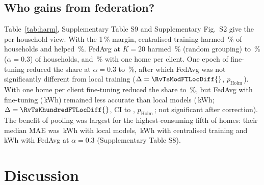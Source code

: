 \subsection{Who gains from federation?}
Table~\ref{tab:harm}, Supplementary Table S9 and Supplementary Fig.~S2 give the per-household view. With the 1\,\% margin, centralised training
harmed \RvHarmCentralisedMargin{}\,\% of households and helped \RvHelpCentralisedMargin{}\,\%. FedAvg at $K=20$ harmed
\RvHarmFedrandomMargin{}\,\% (random grouping) to \RvHarmFedModerateMargin{}\,\% ($\alpha=0.3$) of households, and
\RvHarmFedKonezerozeroMargin{}\,\% with one home per client. One epoch of fine-tuning reduced the share at $\alpha=0.3$
to \RvHarmFedModerateFTMargin{}\,\%, after which FedAvg was not significantly different from local training
($\Delta=\RvTsModFTLocDiff{}$, $p_{\mathrm{Holm}}$\,\RvTsModFTLocP{}). With one home per client fine-tuning reduced the
share to \RvHarmFedKonezerozeroFTMargin{}\,\%, but FedAvg with fine-tuning (\EonethreefedavghouseholdFT{}\,kWh) remained
less accurate than local models (\EonelocalMAE{}\,kWh; $\Delta=\RvTsKhundredFTLocDiff{}$, CI \RvTsKhundredFTLocLo{} to
\RvTsKhundredFTLocHi{}, $p_{\mathrm{Holm}}$\,\RvTsKhundredFTLocP{}; not significant after correction). The benefit of pooling was largest for the highest-consuming fifth of homes:
their median MAE was \RvQTopLocal{}\,kWh with local models, \RvQTopCentral{}\,kWh with centralised training and
\RvQTopFed{}\,kWh with FedAvg at $\alpha=0.3$ (Supplementary Table S8).




\begin{table}
\caption{Share of households (\%) whose test MAE was worse than local-only training at all, worse by more than 1\,\%,
and better by more than 1\,\%. FedAvg at $K=20$ unless stated; FT: after one epoch of local fine-tuning.}\label{tab:harm}

\end{table}


\section{Discussion}

